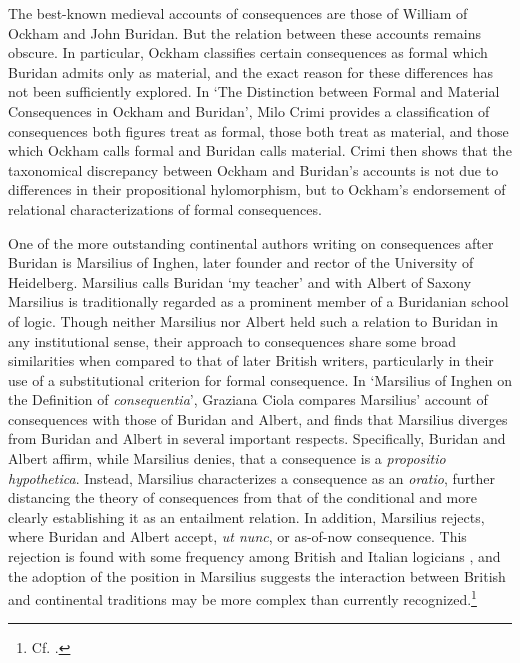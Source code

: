 \documentclass[]{article}
\begin{document}
The best-known medieval accounts of consequences are those of William of Ockham and John Buridan. But the relation between these accounts remains obscure. In particular, Ockham classifies certain consequences as formal which Buridan admits only as material, and the exact reason for these differences has not been sufficiently explored. In `The Distinction between Formal and Material Consequences in Ockham and Buridan', Milo Crimi provides a classification of consequences both figures treat as formal, those both treat as material, and those which Ockham calls formal and Buridan calls material. Crimi then shows that the taxonomical discrepancy between Ockham and Buridan's accounts is not due to differences in their propositional hylomorphism, but to Ockham's endorsement of relational characterizations of formal consequences.

One of the more outstanding continental authors writing on consequences after Buridan is Marsilius of Inghen, later founder and rector of the University of Heidelberg. Marsilius calls Buridan `my teacher'\autocite[fol. 106va]{MarsiliusDeGen} and with Albert of Saxony Marsilius is traditionally regarded as a prominent member of a Buridanian school of logic. Though neither Marsilius nor Albert held such a relation to Buridan in any institutional sense,\autocite{Courtenay2004,Thijssen2004} their approach to consequences share some broad similarities when compared to that of later British writers, particularly in their use of a substitutional criterion for formal consequence. In `Marsilius of Inghen on the Definition of \textit{consequentia}', Graziana Ciola compares Marsilius' account of consequences with those of Buridan and Albert, and finds that Marsilius diverges from Buridan and Albert in several important respects. Specifically, Buridan and Albert affirm, while Marsilius denies, that a consequence is a \textit{propositio hypothetica}. Instead, Marsilius characterizes a consequence as an \textit{oratio}, further distancing the theory of consequences from that of the conditional and more clearly establishing it as an entailment relation. In addition, Marsilius rejects, where Buridan and Albert accept, \textit{ut nunc}, or as-of-now consequence. This rejection is found with some frequency among British and Italian logicians \autocite[A.II, par. 5, pp. 92-93]{Green-Pedersen1982}, and the adoption of the position in Marsilius suggests the interaction between British and continental traditions may be more complex than currently recognized.\footnote{Cf. \autocite[46]{Green-Pedersen1981}.}
\end{document}
